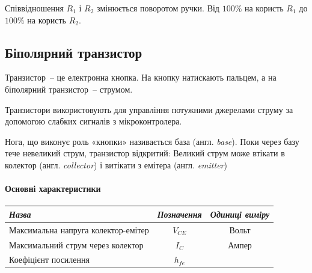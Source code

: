 \documentclass[12pt,a4paper]{book}  %
\begin{document}

Співвідношення $R_1$ і $R_2$ змінюється поворотом ручки. Від $100\%$ на користь $R_1$ до $100\%$ на користь $R_2$.

\subsection{Біполярний транзистор}

Транзистор~-- це електронна кнопка. На кнопку натискають пальцем, а на біполярний транзистор~-- струмом.

\begin{figure}[h!]
\label{ris:image}
\end{figure}


Транзистори використовують для управління потужними джерелами струму за допомогою слабких сигналів з мікроконтролера.

Нога, що виконує роль «кнопки» називається база (англ. \textit{base}).
Поки через базу тече невеликий струм, транзистор відкритий:
Великий струм може втікати в колектор (англ. \textit{collector}) і витікати з емітера (англ. \textit{emitter})

\paragraph{Основні характеристики}
\begin{center}
\begin{tabular}{|l|c|c|}
\hline
\textit{Назва} & \textit{Позначення} & \textit{Одиниці виміру} \\
\hline
Максимальна напруга колектор-емітер & $V_{CE}$ & Вольт \\
\hline		
Максимальний струм через колектор & $I_C$ & Ампер \\
\hline
Коефіцієнт посилення & $h_{fe}$ & ~ \\
\hline
\end{tabular}
\end{center}
\end{document}
